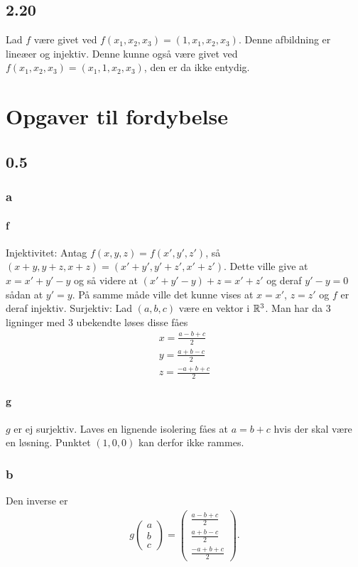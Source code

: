 		\subsection{2.20} Lad $f$ være givet ved $f(x_1,x_2,x_3)=(1,x_1,x_2,x_3)$. Denne afbildning er lineæer og injektiv. Denne kunne også være givet ved $f(x_1,x_2,x_3)=(x_1,1,x_2,x_3)$, den er da ikke entydig.

	\section{Opgaver til fordybelse}

		\subsection{0.5} 

			\subsubsection{a} 

			\paragraph{f} Injektivitet: Antag $f(x,y,z)=f(x',y',z')$, så $(x+y,y+z,x+z)=(x'+y',y'+z',x'+z')$. Dette ville give at $x=x'+y'-y$ og så videre at $(x'+y'-y)+z=x'+z'$ og deraf $y'-y=0$ sådan at $y'=y$. På samme måde ville det kunne vises at $x=x'$, $z=z'$ og $f$ er deraf injektiv. Surjektiv: Lad $(a,b,c)$ være en vektor i $\mathbb{R}^3$. Man har da 3 ligninger med 3 ubekendte løses disse fåes
				\begin{align*}
					x=\frac{a-b+c}{2}\\
					y=\frac{a+b-c}{2}\\
					z=\frac{-a+b+c}{2}
				\end{align*} 

			\paragraph{g} $g$ er ej surjektiv. Laves en lignende isolering fåes at $a=b+c$ hvis der skal være en løsning. Punktet $(1,0,0)$ kan derfor ikke rammes.

			\subsubsection{b}

			Den inverse er 
				\begin{align*}
					g\left(\begin{array}{l}{a} \\ {b} \\ {c}\end{array}\right)
					=\left(\begin{array}{l}{\frac{a-b+c}{2}} \\ {\frac{a+b-c}{2}} \\ {\frac{-a+b+c}{2}}\end{array}\right).
				\end{align*} 


